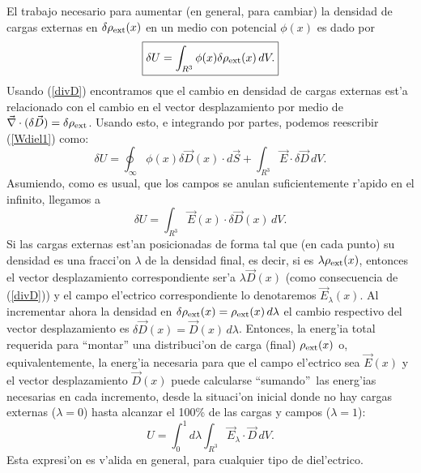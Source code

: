 El trabajo necesario para aumentar (en general, para cambiar) la densidad de
cargas externas en $\delta\rho_{\rm ext}(x)$ en un medio con potencial
$\phi(x)$ es dado por
\begin{equation}\label{Wdiel1}
 \boxed{\delta U=\int_{R^3}\phi(x)\delta\rho_{\rm ext}(x)\,dV.} 
\end{equation}
Usando (\ref{divD}) encontramos que el cambio en densidad de cargas externas
est'a relacionado con el cambio en el vector desplazamiento por medio de
$\vec\nabla\cdot(\delta\vec{D})=\delta\rho_{\rm ext}$. Usando esto, e integrando
por partes, podemos reescribir (\ref{Wdiel1}) como:
\begin{equation}
 \delta U=\oint_{\infty}\phi (x)\delta\vec{D}(x)\cdot
d\vec{S}+\int_{R^3}\vec{E}\cdot\delta\vec{D}\,dV.
\end{equation}
Asumiendo, como es usual, que los campos se anulan suficientemente r'apido en
el infinito, llegamos a
\begin{equation}
 \boxed{\delta U=\int_{R^3}\vec{E}(x)\cdot\delta\vec{D}(x)\,dV.} \label{dUE}
\end{equation}
Si las cargas externas est'an posicionadas de forma tal que (en cada punto) su
densidad es una fracci'on $\lambda$ de la densidad final, es decir, si es
$\lambda\rho_{\rm ext}(x)$, entonces el vector desplazamiento correspondiente
ser'a $\lambda\vec{D}(x)$ (como consecuencia de (\ref{divD})) y el campo
el'ectrico correspondiente lo denotaremos $\vec{E}_\lambda(x)$. Al incrementar
ahora la densidad en $\delta\rho_{\rm ext}(x)=\rho_{\rm ext}(x)\,d\lambda$ el cambio respectivo del vector desplazamiento es $\delta\vec{D}(x)=\vec{D}(x)\,d\lambda$. Entonces, la energ'ia total requerida para ``montar'' una distribuci'on de carga (final)
$\rho_{\rm ext}(x)$ o, equivalentemente, la energ'ia necesaria para que el campo
el'ectrico sea $\vec{E}(x)$ y el vector desplazamiento $\vec{D}(x)$ puede
calcularse ``sumando''\, las energ'ias necesarias en cada incremento, desde la
situaci'on inicial donde no hay cargas externas ($\lambda=0$) hasta alcanzar el
100\% de las cargas y campos ($\lambda=1$):
\begin{equation}
U=\int_0^1 d\lambda\int_{R^3}\vec{E}_\lambda\cdot \vec{D}\,dV .
\end{equation}
Esta expresi'on es v'alida en general, para cualquier tipo de diel'ectrico.

